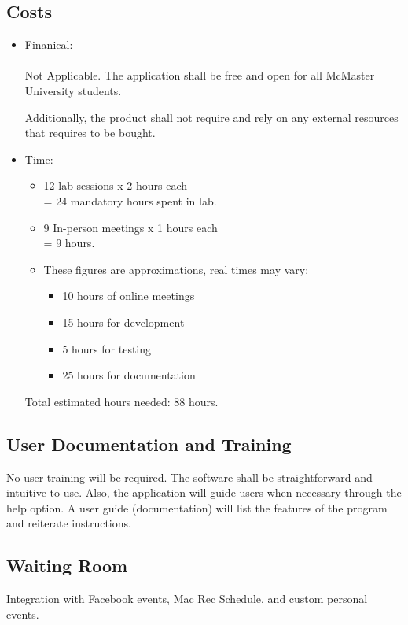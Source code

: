 \documentclass[12pt, titlepage]{article}
\begin{document}
\subsection{Costs}
\begin{itemize}
\item Finanical:\\
\\
Not Applicable. 
The application shall be free and open for all McMaster University students. 

\color{blue} Additionally, the product shall not require and rely on any external resources that requires to be bought.
\color{black}
		
\item Time:
\begin{itemize}
\item 12 lab sessions x 2 hours each\\
= 24 mandatory hours spent in lab.
\item 9 In-person meetings x 1 hours each\\
= 9 hours.
\item These figures are approximations, real times may vary:
\begin{itemize}
\item 10 hours of online meetings
\item 15 hours for development
\item 5 hours for testing
\item 25 hours for documentation
\end{itemize}

\end{itemize}

Total estimated hours needed: 88 hours.

\end{itemize}

\subsection{User Documentation and Training}
\hspace{5mm}
\color{blue}
No user training will be required. The software shall be straightforward and intuitive to use. Also, the application will guide users when necessary through the help option. A user guide (documentation) will list the features of the program and reiterate instructions. 
\color{black}
\subsection{Waiting Room}
\hspace{5mm}
Integration with Facebook events, Mac Rec Schedule, and custom personal events. 
\end{document}
